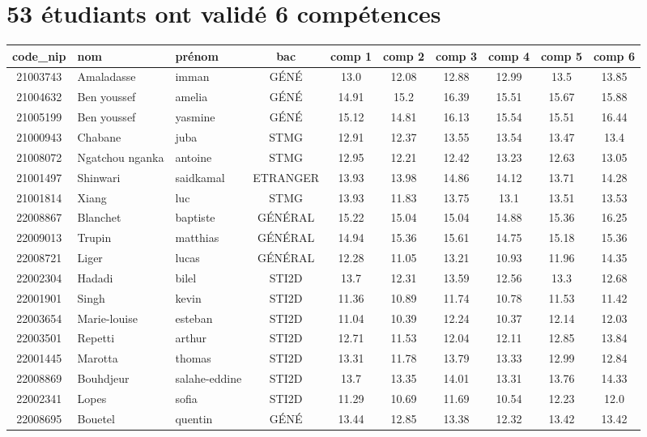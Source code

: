 \documentclass{article}%
\begin{document}
%
\normalsize%
\pagestyle{header}%
\section*{53 étudiants ont validé 6 compétences}%
\label{sec:53tudiantsontvalid6comptences}%
\begin{tabular}{|c|l|l|c|c|c|c|c|c|c|}%
\hline%
\rowcolor{vert}%
code\_nip&nom&prénom&bac&comp 1&comp 2&comp 3&comp 4&comp 5&comp 6\\%
\hline%
21003743&Amaladasse&imman&GÉNÉ&13.0&12.08&12.88&12.99&13.5&13.85\\%
\hline%
21004632&Ben youssef&amelia&GÉNÉ&14.91&15.2&16.39&15.51&15.67&15.88\\%
\hline%
21005199&Ben youssef&yasmine&GÉNÉ&15.12&14.81&16.13&15.54&15.51&16.44\\%
\hline%
21000943&Chabane&juba&STMG&12.91&12.37&13.55&13.54&13.47&13.4\\%
\hline%
21008072&Ngatchou nganka&antoine&STMG&12.95&12.21&12.42&13.23&12.63&13.05\\%
\hline%
21001497&Shinwari&saidkamal&ETRANGER&13.93&13.98&14.86&14.12&13.71&14.28\\%
\hline%
21001814&Xiang&luc&STMG&13.93&11.83&13.75&13.1&13.51&13.53\\%
\hline%
22008867&Blanchet&baptiste&GÉNÉRAL&15.22&15.04&15.04&14.88&15.36&16.25\\%
\hline%
22009013&Trupin&matthias&GÉNÉRAL&14.94&15.36&15.61&14.75&15.18&15.36\\%
\hline%
22008721&Liger&lucas&GÉNÉRAL&12.28&11.05&13.21&10.93&11.96&14.35\\%
\hline%
22002304&Hadadi&bilel&STI2D&13.7&12.31&13.59&12.56&13.3&12.68\\%
\hline%
22001901&Singh&kevin&STI2D&11.36&10.89&11.74&10.78&11.53&11.42\\%
\hline%
22003654&Marie{-}louise&esteban&STI2D&11.04&10.39&12.24&10.37&12.14&12.03\\%
\hline%
22003501&Repetti&arthur&STI2D&12.71&11.53&12.04&12.11&12.85&13.84\\%
\hline%
22001445&Marotta&thomas&STI2D&13.31&11.78&13.79&13.33&12.99&12.84\\%
\hline%
22008869&Bouhdjeur&salahe{-}eddine&STI2D&13.7&13.35&14.01&13.31&13.76&14.33\\%
\hline%
22002341&Lopes&sofia&STI2D&11.29&10.69&11.69&10.54&12.23&12.0\\%
\hline%
22008695&Bouetel&quentin&GÉNÉ&13.44&12.85&13.38&12.32&13.42&13.42\\%

\end{tabular}
\end{document}
